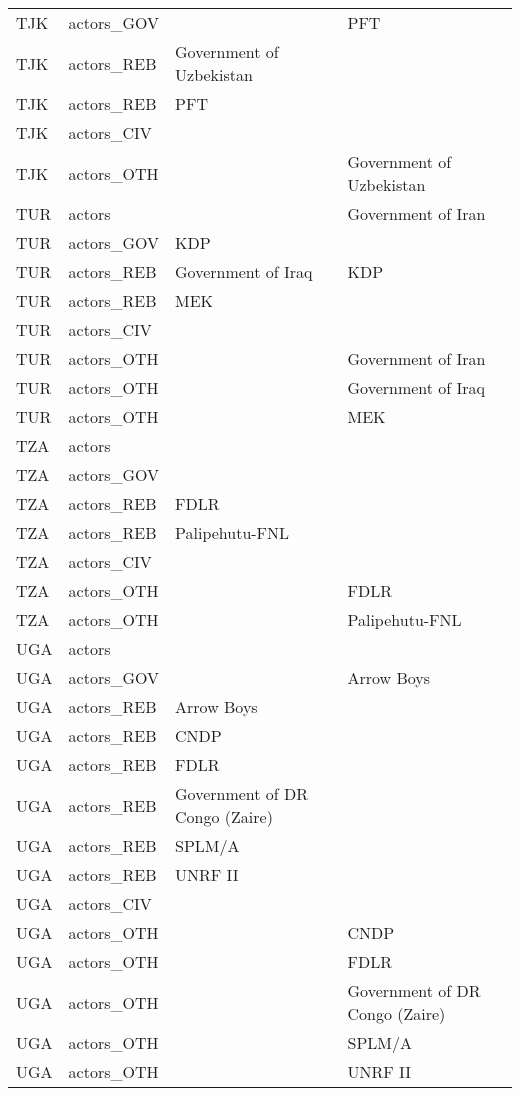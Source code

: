 \begin{table}[ht]
\begin{tabular}{llll}
  TJK & actors\_GOV &  & PFT \\ 
  TJK & actors\_REB & Government of Uzbekistan &  \\ 
  TJK & actors\_REB & PFT &  \\ 
  TJK & actors\_CIV &  &  \\ 
  TJK & actors\_OTH &  & Government of Uzbekistan \\ 
  TUR & actors &  & Government of Iran \\ 
  TUR & actors\_GOV & KDP &  \\ 
  TUR & actors\_REB & Government of Iraq & KDP \\ 
  TUR & actors\_REB & MEK &  \\ 
  TUR & actors\_CIV &  &  \\ 
  TUR & actors\_OTH &  & Government of Iran \\ 
  TUR & actors\_OTH &  & Government of Iraq \\ 
  TUR & actors\_OTH &  & MEK \\ 
  TZA & actors &  &  \\ 
  TZA & actors\_GOV &  &  \\ 
  TZA & actors\_REB & FDLR &  \\ 
  TZA & actors\_REB & Palipehutu-FNL &  \\ 
  TZA & actors\_CIV &  &  \\ 
  TZA & actors\_OTH &  & FDLR \\ 
  TZA & actors\_OTH &  & Palipehutu-FNL \\ 
  UGA & actors &  &  \\ 
  UGA & actors\_GOV &  & Arrow Boys \\ 
  UGA & actors\_REB & Arrow Boys &  \\ 
  UGA & actors\_REB & CNDP &  \\ 
  UGA & actors\_REB & FDLR &  \\ 
  UGA & actors\_REB & Government of DR Congo (Zaire) &  \\ 
  UGA & actors\_REB & SPLM/A &  \\ 
  UGA & actors\_REB & UNRF II &  \\ 
  UGA & actors\_CIV &  &  \\ 
  UGA & actors\_OTH &  & CNDP \\ 
  UGA & actors\_OTH &  & FDLR \\ 
  UGA & actors\_OTH &  & Government of DR Congo (Zaire) \\ 
  UGA & actors\_OTH &  & SPLM/A \\ 
  UGA & actors\_OTH &  & UNRF II \\ 

\end{tabular}
\end{table}
